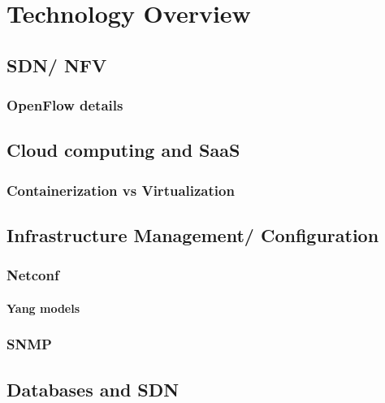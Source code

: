 \chapter{Technology Overview} \label{chap:tech} %

\section {SDN/ NFV}
\subsection {OpenFlow details}
\section {Cloud computing and SaaS}
\subsection {Containerization vs Virtualization}
\section {Infrastructure Management/ Configuration}
\subsection {Netconf}
\subsubsection {Yang models}
\subsection {SNMP}
\section {Databases and SDN} %

